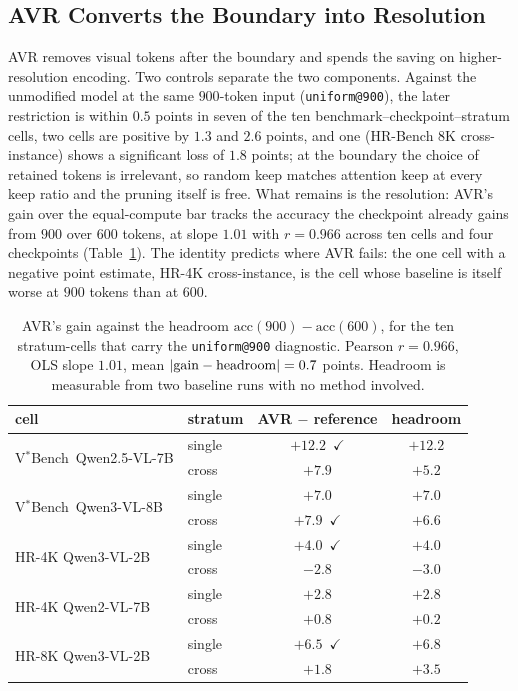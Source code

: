 \documentclass{article} %
\newcommand{\gd}[1]{\textcolor{gd}{#1}}
\newcommand{\ok}{\gd{$\checkmark$}}
\newcommand{\vstar}{V$^*$Bench}
\begin{document}
\subsection{AVR Converts the Boundary into Resolution}
\label{sec:avr_results}

AVR removes visual tokens after the boundary and spends the saving on higher-resolution encoding. Two controls separate the two components. Against the unmodified model at the same $900$-token input (\texttt{uniform@900}), the later restriction is within $0.5$ points in seven of the ten benchmark--checkpoint--stratum cells, two cells are positive by $1.3$ and $2.6$ points, and one (HR-Bench 8K cross-instance) shows a significant loss of $1.8$ points; at the boundary the choice of retained tokens is irrelevant, so random keep matches attention keep at every keep ratio and the pruning itself is free. What remains is the resolution: AVR's gain over the equal-compute bar tracks the accuracy the checkpoint already gains from $900$ over $600$ tokens, at slope $1.01$ with $r=0.966$ across ten cells and four checkpoints (Table~\ref{tab:identity}). The identity predicts where AVR fails: the one cell with a negative point estimate, HR-4K cross-instance, is the cell whose baseline is itself worse at $900$ tokens than at $600$.

\begin{table}[h]\centering\small
\caption{AVR's gain against the headroom $\mathrm{acc}(900)-\mathrm{acc}(600)$, for the ten stratum-cells that
carry the \texttt{uniform@900} diagnostic. Pearson $r=0.966$, OLS slope $1.01$, mean
$|{\rm gain}-{\rm headroom}|=0.7$ points. Headroom is measurable from two baseline runs with no method involved.}
\begin{tabular}{llcc}
\toprule
cell & stratum & AVR $-$ reference & headroom\\
\midrule
\multirow{2}{*}{\vstar\ Qwen2.5-VL-7B} & single & \gd{$+12.2$}~\ok & $+12.2$\\
 & cross & $+7.9$ & $+5.2$\\
\multirow{2}{*}{\vstar\ Qwen3-VL-8B} & single & $+7.0$ & $+7.0$\\
 & cross & \gd{$+7.9$}~\ok & $+6.6$\\
\multirow{2}{*}{HR-4K Qwen3-VL-2B} & single & \gd{$+4.0$}~\ok & $+4.0$\\
 & cross & $-2.8$ & $-3.0$\\
\multirow{2}{*}{HR-4K Qwen2-VL-7B} & single & $+2.8$ & $+2.8$\\
 & cross & $+0.8$ & $+0.2$\\
\multirow{2}{*}{HR-8K Qwen3-VL-2B} & single & \gd{$+6.5$}~\ok & $+6.8$\\
 & cross & $+1.8$ & $+3.5$\\
\bottomrule
\end{tabular}\label{tab:identity}
\end{table}
\end{document}

